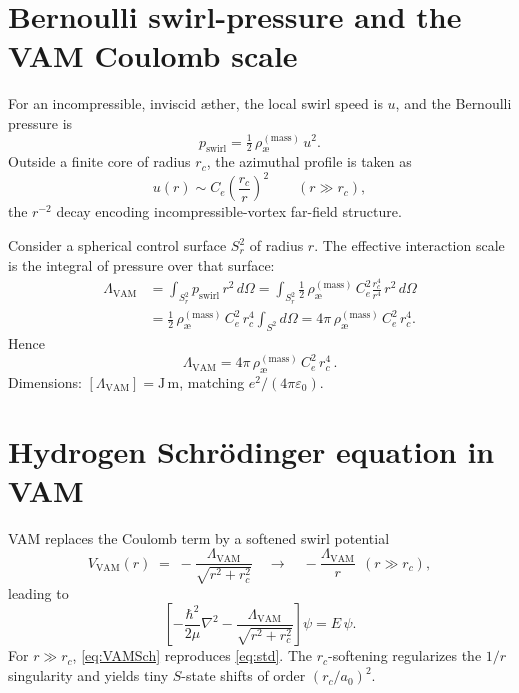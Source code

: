 \documentclass[12pt]{article}
\newcommand{\aeRhoM}{\rho_{\text{\ae}}^{(\text{mass})}}
\newcommand{\Ce}{C_e}
\newcommand{\rc}{r_c}
\newcommand{\Lam}{\Lambda_{\text{VAM}}}
\begin{document}
    \section{Bernoulli swirl-pressure and the VAM Coulomb scale}
    For an incompressible, inviscid æther, the local swirl speed is \(u\), and the Bernoulli pressure is
    \begin{equation}
        p_{\text{swirl}} = \tfrac{1}{2}\,\aeRhoM\,u^2 .
    \end{equation}
    Outside a finite core of radius \(\rc\), the azimuthal profile is taken as
    \begin{equation}
        u(r)\sim \Ce\left(\frac{\rc}{r}\right)^2 \qquad (r\gg \rc),
    \end{equation}
    the \(r^{-2}\) decay encoding incompressible-vortex far-field structure.

    Consider a spherical control surface \(S^2_r\) of radius \(r\). The effective interaction scale is the integral of pressure over that surface:
    \begin{align}
        \Lam &= \int_{S^2_r} p_{\text{swirl}}\, r^2\,d\Omega
        = \int_{S^2_r} \frac{1}{2}\,\aeRhoM\,\Ce^2\frac{\rc^4}{r^4}\,r^2\,d\Omega \\
        &= \frac{1}{2}\,\aeRhoM\,\Ce^2\,\rc^4\int_{S^2}\! d\Omega
        = 4\pi\,\aeRhoM\,\Ce^2\,\rc^4 .
    \end{align}
    Hence
    \begin{equation}
        \boxed{\Lam = 4\pi\,\aeRhoM\,\Ce^2\,\rc^4}\,.
        \label{eq:LambdaVAM}
    \end{equation}
    Dimensions: \([\Lam]=\mathrm{J\,m}\), matching \(e^2/(4\pi\varepsilon_0)\).

    \section{Hydrogen Schr\"odinger equation in VAM}
    VAM replaces the Coulomb term by a softened swirl potential
    \begin{equation}
        V_{\text{VAM}}(r)\;=\;-\frac{\Lam}{\sqrt{r^2+\rc^2}}
        \quad\to\quad -\frac{\Lam}{r}\ \ (r\gg \rc),
    \end{equation}
    leading to
    \begin{equation}
        \label{eq:VAMSch}
        \left[-\frac{\hbar^2}{2\mu}\nabla^2 - \frac{\Lam}{\sqrt{r^2+\rc^2}}\right]\psi = E\,\psi.
    \end{equation}
    For \(r\gg\rc\), \eqref{eq:VAMSch} reproduces \eqref{eq:std}. The \(\rc\)-softening regularizes the \(1/r\) singularity and yields tiny \(S\)-state shifts of order \((\rc/a_0)^2\).
\end{document}
